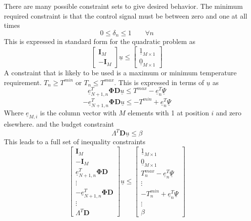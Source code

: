 \documentclass[11pt]{article}
\begin{document}
\section{}
There are many possible constraint sets to give desired behavior. The minimum required constraint is that the control signal must be between zero and one at all times
\begin{equation}
0 \leq \delta_{n} \leq 1 \qquad \forall n
\end{equation}
This is expressed in standard form for the quadratic problem as
\begin{equation}
\left[
\begin{array}{c}
\mathbf{I}_{M} \\ \hline
- \mathbf{I}_{M} 
\end{array}\right]\underline{u} \leq \left[\begin{array}{c}
\underline{1}_{M \times 1} \\ \hline
\underline{0}_{M \times 1}
\end{array}\right]
\end{equation}
A constraint that is likely to be used is a maximum or minimum temperature requirement. $T_{n} \geq T^{min}$ or $T_{n} \leq T^{max}$. This is expressed in terms of $\underline{u}$ as
\begin{equation}
\underline{e}_{N+1,n}^{T}  \mathbf{\Phi D} \underline{u} \leq T^{max}-\underline{e}_{n}^{T} \underline{\Psi}
\end{equation}
\begin{equation}
-\underline{e}_{N+1,n}^{T} \mathbf{\Phi D} \underline{u} \leq -T^{min}+\underline{e}_{n}^{T} \underline{\Psi}
\end{equation}
Where $\underline{e}_{M,i}$ is the column vector with $M$ elements with 1 at position $i$ and zero elsewhere.
and the budget constraint
\begin{equation}
\Lambda^{T} \mathbf{D} \underline{u} \leq \beta
\end{equation}
This leads to a full set of inequality constraints
\begin{equation}
\left[
\begin{array}{c}
\mathbf{I}_{M} \\ \hline
- \mathbf{I}_{M} \\ \hline
\underline{e}_{N+1,n}^{T}  \mathbf{\Phi D}  \\
\vdots \\ \hline
-\underline{e}_{N+1,n}^{T}  \mathbf{\Phi D}  \\ 
\vdots \\ \hline
\Lambda^{T} \mathbf{D}
\end{array}\right]
\underline{u}\leq \left[
\begin{array}{c}
\underline{1}_{M \times 1} \\ \hline
\underline{0}_{M \times 1} \\ \hline
T^{max}_{n}-\underline{e}_{n}^{T} \underline{\Psi} \\
\vdots \\ \hline
-T^{min}_{n}+\underline{e}_{n}^{T} \underline{\Psi} \\ 
\vdots \\ \hline
\beta
\end{array}\right]
\end{equation}
\end{document}
